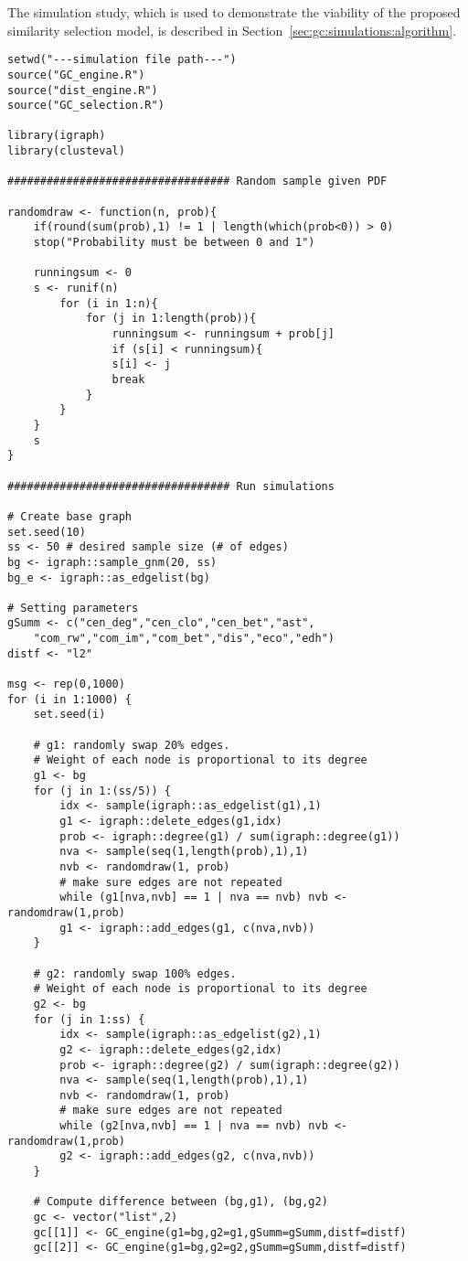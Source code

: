 The simulation study, which is used to demonstrate the viability of the 
proposed similarity selection model, is described in 
Section~\ref{sec:gc:simulations:algorithm}.

{
\begin{lstlisting}
setwd("---simulation file path---")
source("GC_engine.R")
source("dist_engine.R")
source("GC_selection.R")

library(igraph)
library(clusteval)

################################## Random sample given PDF

randomdraw <- function(n, prob){
	if(round(sum(prob),1) != 1 | length(which(prob<0)) > 0) 
	stop("Probability must be between 0 and 1")
	
	runningsum <- 0
	s <- runif(n)
		for (i in 1:n){
			for (j in 1:length(prob)){
				runningsum <- runningsum + prob[j]
				if (s[i] < runningsum){
				s[i] <- j
				break
			} 
		}
	}
	s
}

################################## Run simulations

# Create base graph
set.seed(10)
ss <- 50 # desired sample size (# of edges)
bg <- igraph::sample_gnm(20, ss)
bg_e <- igraph::as_edgelist(bg)

# Setting parameters
gSumm <- c("cen_deg","cen_clo","cen_bet","ast",
	"com_rw","com_im","com_bet","dis","eco","edh")
distf <- "l2"

msg <- rep(0,1000)
for (i in 1:1000) {
	set.seed(i)
	
	# g1: randomly swap 20% edges. 
	# Weight of each node is proportional to its degree
	g1 <- bg
	for (j in 1:(ss/5)) {
		idx <- sample(igraph::as_edgelist(g1),1)
		g1 <- igraph::delete_edges(g1,idx)
		prob <- igraph::degree(g1) / sum(igraph::degree(g1))
		nva <- sample(seq(1,length(prob),1),1)
		nvb <- randomdraw(1, prob)
		# make sure edges are not repeated
		while (g1[nva,nvb] == 1 | nva == nvb) nvb <- randomdraw(1,prob)
		g1 <- igraph::add_edges(g1, c(nva,nvb))
	}
	
	# g2: randomly swap 100% edges. 
	# Weight of each node is proportional to its degree
	g2 <- bg
	for (j in 1:ss) {
		idx <- sample(igraph::as_edgelist(g2),1)
		g2 <- igraph::delete_edges(g2,idx)
		prob <- igraph::degree(g2) / sum(igraph::degree(g2))
		nva <- sample(seq(1,length(prob),1),1)
		nvb <- randomdraw(1, prob)
		# make sure edges are not repeated
		while (g2[nva,nvb] == 1 | nva == nvb) nvb <- randomdraw(1,prob)
		g2 <- igraph::add_edges(g2, c(nva,nvb))
	}
	
	# Compute difference between (bg,g1), (bg,g2)
	gc <- vector("list",2)
	gc[[1]] <- GC_engine(g1=bg,g2=g1,gSumm=gSumm,distf=distf)
	gc[[2]] <- GC_engine(g1=bg,g2=g2,gSumm=gSumm,distf=distf)
	

\end{lstlisting}}
